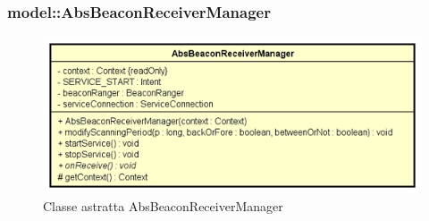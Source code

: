 \documentclass[../DefinizioneDiProdotto.tex]{subfiles}
\begin{document}
\subsubsection{model::AbsBeaconReceiverManager}

    \begin{figure}[H]
        \centering
        \includegraphics{img/AbsBeaconReceiverManager.png}
        \caption{Classe astratta AbsBeaconReceiverManager}\label{fig:model::AbsBeaconReceiverManager} 
    \end{figure}
\end{document}
